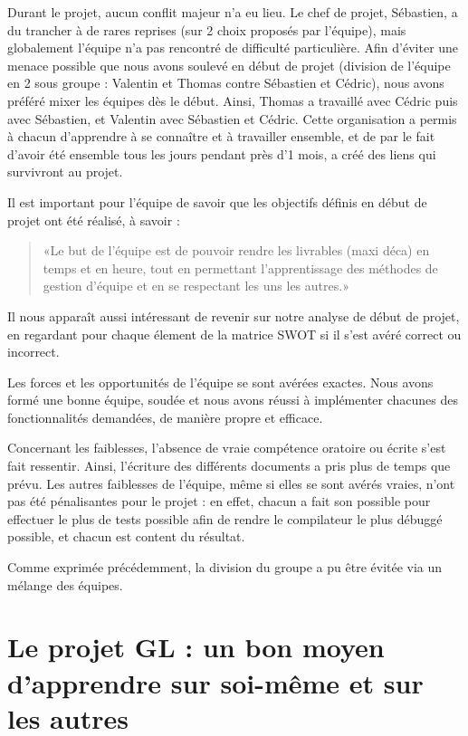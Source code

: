 \documentclass[11pt]{article}
\begin{document}
Durant le projet, aucun conflit majeur n'a eu lieu. Le chef de projet, Sébastien, a du trancher à de rares reprises (sur 2 choix proposés par l'équipe), mais globalement l'équipe n'a pas rencontré de difficulté particulière. Afin d'éviter une menace possible que nous avons soulevé en début de projet (division de l'équipe en 2 sous groupe : Valentin et Thomas contre Sébastien et Cédric), nous avons préféré mixer les équipes dès le début. Ainsi, Thomas a travaillé avec Cédric puis avec Sébastien, et Valentin avec Sébastien et Cédric. Cette organisation a permis à chacun d'apprendre à se connaître et à travailler ensemble, et de par le fait d'avoir été ensemble tous les jours pendant près d'1 mois, a créé des liens qui survivront au projet. 


Il est important pour l'équipe de savoir que les objectifs définis en début de projet ont été réalisé, à savoir : 
\begin{quotation}
«Le but de l’équipe est de pouvoir rendre les livrables (maxi déca) en temps et en heure, tout en permettant l’apprentissage des méthodes de gestion d’équipe et en se respectant les uns les autres.»
\end{quotation}

Il nous apparaît aussi intéressant de revenir sur notre analyse de début de projet, en regardant pour chaque élement de la matrice SWOT si il s'est avéré correct ou incorrect.

Les forces et les opportunités de l'équipe se sont avérées exactes. Nous avons formé une bonne équipe, soudée et nous avons réussi à implémenter chacunes des fonctionnalités demandées, de manière propre et efficace.

Concernant les faiblesses, l'absence de vraie compétence oratoire ou écrite s'est fait ressentir. Ainsi, l'écriture des différents documents a pris plus de temps que prévu. Les autres faiblesses de l'équipe, même si elles se sont avérés vraies, n'ont pas été pénalisantes pour le projet : en effet, chacun a fait son possible pour effectuer le plus de tests possible afin de rendre le compilateur le plus débuggé possible, et chacun est content du résultat.

Comme exprimée précédemment, la division du groupe a pu être évitée via un mélange des équipes. 


\section{Le projet GL : un bon moyen d'apprendre sur soi-même et sur les autres}
\end{document}
